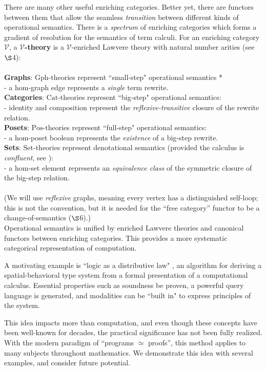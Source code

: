 \documentclass[a4paper,UKenglish]{article}
\theoremstyle{definition}
\newcommand{\Gph}{\mathrm{Gph}}
\newcommand{\Set}{\mathrm{Set}}
\newcommand{\Cat}{\mathrm{Cat}}
\newcommand{\Pos}{\mathrm{Pos}}
\newcommand{\V}{\mathscr{V}}
\begin{document}
There are many other useful enriching categories. Better yet, there are functors between them that allow the seamless \textit{transition} between different kinds of operational semantics. There is a \textit{spectrum} of enriching categories which forms a gradient of resolution for the semantics of term calculi. For an enriching category $\V$, a \textbf{$\V$-theory} is a $\V$-enriched Lawvere theory with natural number arities (see $\S$4):\\\\
\textbf{Graphs}: $\Gph$-theories represent ``small-step" operational semantics * \\ - a hom-graph edge represents a \textit{single} term rewrite.\\
\textbf{Categories}: $\Cat$-theories represent ``big-step" operational semantics:\\ - identity and composition represent the \textit{reflexive-transitive} closure of the rewrite relation.\\
\textbf{Posets}: $\Pos$-theories represent ``full-step" operational semantics:\\ - a hom-poset boolean represents the \textit{existence} of a big-step rewrite.\\
\textbf{Sets}: $\Set$-theories represent denotational semantics (provided the calculus is \textit{confluent}, see \cite{lam}):\\ - a hom-set element represents an \textit{equivalence class} of the symmetric closure of the big-step relation.\\\\
(We will use \textit{reflexive} graphs, meaning every vertex has a distinguished self-loop; this is not the convention, but it is needed for the ``free category'' functor to be a change-of-semantics ($\S$6).)\\

Operational semantics is unified by enriched Lawvere theories and canonical functors between enriching categories. This provides a more systematic categorical representation of computation.

A motivating example is ``logic as a distributive law" \cite{ladl}, an algorithm for deriving a spatial-behavioral type system from a formal presentation of a computational calculus. Essential properties such as soundness be proven, a powerful query language is generated, and modalities can be ``built in" to express principles of the system.

This idea impacts more than computation, and even though these concepts have been well-known for decades, the practical significance has not been fully realized. With the modern paradigm of ``programs $\simeq$ proofs'', this method applies to many subjects throughout mathematics. We demonstrate this idea with several examples, and consider future potential.\\
\end{document}
